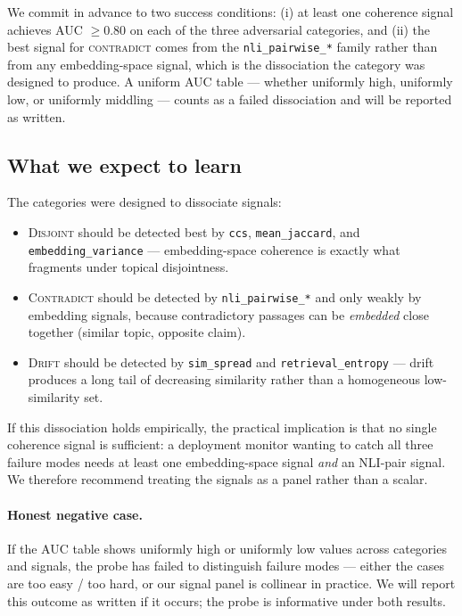 We commit in advance to two success conditions: (i) at least one
coherence signal achieves AUC $\geq 0.80$ on each of the three
adversarial categories, and (ii) the best signal for \textsc{contradict}
comes from the \texttt{nli\_pairwise\_*} family rather than from any
embedding-space signal, which is the dissociation the category was
designed to produce. A uniform AUC table — whether uniformly high,
uniformly low, or uniformly middling — counts as a failed dissociation
and will be reported as written.

\subsection{What we expect to learn}

The categories were designed to dissociate signals:

\begin{itemize}
  \item \textsc{Disjoint} should be detected best by
        \texttt{ccs}, \texttt{mean\_jaccard}, and \texttt{embedding\_variance}
        — embedding-space coherence is exactly what fragments under
        topical disjointness.
  \item \textsc{Contradict} should be detected by
        \texttt{nli\_pairwise\_*} and only weakly by embedding signals,
        because contradictory passages can be \emph{embedded} close
        together (similar topic, opposite claim).
  \item \textsc{Drift} should be detected by \texttt{sim\_spread} and
        \texttt{retrieval\_entropy} — drift produces a long tail of
        decreasing similarity rather than a homogeneous low-similarity
        set.
\end{itemize}

If this dissociation holds empirically, the practical implication is that
no single coherence signal is sufficient: a deployment monitor wanting to
catch all three failure modes needs at least one embedding-space signal
\emph{and} an NLI-pair signal. We therefore recommend treating the
signals as a panel rather than a scalar.

\paragraph{Honest negative case.} If the AUC table shows uniformly high
or uniformly low values across categories and signals, the probe has
failed to distinguish failure modes — either the cases are too easy / too
hard, or our signal panel is collinear in practice. We will report this
outcome as written if it occurs; the probe is informative under both
results.
